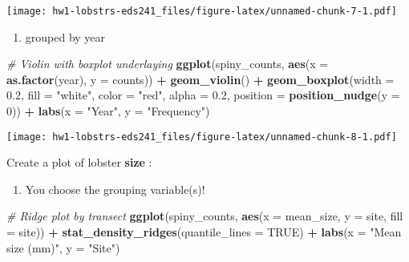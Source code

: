 \documentclass[
]{article}
\newenvironment{Shaded}{\begin{snugshade}}{\end{snugshade}}
\newcommand{\AttributeTok}[1]{\textcolor[rgb]{0.13,0.29,0.53}{#1}}
\newcommand{\CommentTok}[1]{\textcolor[rgb]{0.56,0.35,0.01}{\textit{#1}}}
\newcommand{\ConstantTok}[1]{\textcolor[rgb]{0.56,0.35,0.01}{#1}}
\newcommand{\DecValTok}[1]{\textcolor[rgb]{0.00,0.00,0.81}{#1}}
\newcommand{\FloatTok}[1]{\textcolor[rgb]{0.00,0.00,0.81}{#1}}
\newcommand{\FunctionTok}[1]{\textcolor[rgb]{0.13,0.29,0.53}{\textbf{#1}}}
\newcommand{\NormalTok}[1]{#1}
\newcommand{\SpecialCharTok}[1]{\textcolor[rgb]{0.81,0.36,0.00}{\textbf{#1}}}
\newcommand{\StringTok}[1]{\textcolor[rgb]{0.31,0.60,0.02}{#1}}
\providecommand{\tightlist}{%
  \setlength{\itemsep}{0pt}\setlength{\parskip}{0pt}}
\begin{document}
\texttt{[image: hw1-lobstrs-eds241\_files/figure-latex/unnamed-chunk-7-1.pdf]}

\begin{enumerate}
\def\labelenumi{\arabic{enumi})}
\tightlist
\item
  grouped by year
\end{enumerate}

\begin{Shaded}
\begin{Highlighting}[]
\CommentTok{\# Violin with boxplot underlaying }
\FunctionTok{ggplot}\NormalTok{(spiny\_counts, }\FunctionTok{aes}\NormalTok{(}\AttributeTok{x =} \FunctionTok{as.factor}\NormalTok{(year), }\AttributeTok{y =}\NormalTok{ counts)) }\SpecialCharTok{+}
    \FunctionTok{geom\_violin}\NormalTok{() }\SpecialCharTok{+}
    \FunctionTok{geom\_boxplot}\NormalTok{(}\AttributeTok{width =} \FloatTok{0.2}\NormalTok{, }\AttributeTok{fill =} \StringTok{"white"}\NormalTok{,}
                 \AttributeTok{color =} \StringTok{"red"}\NormalTok{, }\AttributeTok{alpha =} \FloatTok{0.2}\NormalTok{,}
                 \AttributeTok{position =} \FunctionTok{position\_nudge}\NormalTok{(}\AttributeTok{y =} \DecValTok{0}\NormalTok{)) }\SpecialCharTok{+}
    \FunctionTok{labs}\NormalTok{(}\AttributeTok{x =} \StringTok{"Year"}\NormalTok{, }\AttributeTok{y =} \StringTok{"Frequency"}\NormalTok{)}
\end{Highlighting}
\end{Shaded}

\texttt{[image: hw1-lobstrs-eds241\_files/figure-latex/unnamed-chunk-8-1.pdf]}

Create a plot of lobster \textbf{size} :

\begin{enumerate}
\def\labelenumi{\arabic{enumi})}
\setcounter{enumi}{3}
\tightlist
\item
  You choose the grouping variable(s)!
\end{enumerate}

\begin{Shaded}
\begin{Highlighting}[]
\CommentTok{\# Ridge plot by transect}
\FunctionTok{ggplot}\NormalTok{(spiny\_counts, }\FunctionTok{aes}\NormalTok{(}\AttributeTok{x =}\NormalTok{ mean\_size, }\AttributeTok{y =}\NormalTok{ site, }\AttributeTok{fill =}\NormalTok{ site)) }\SpecialCharTok{+}
    \FunctionTok{stat\_density\_ridges}\NormalTok{(}\AttributeTok{quantile\_lines =} \ConstantTok{TRUE}\NormalTok{) }\SpecialCharTok{+}
    \FunctionTok{labs}\NormalTok{(}\AttributeTok{x =} \StringTok{"Mean size (mm)"}\NormalTok{, }\AttributeTok{y =} \StringTok{"Site"}\NormalTok{)}
\end{Highlighting}
\end{Shaded}
\end{document}
